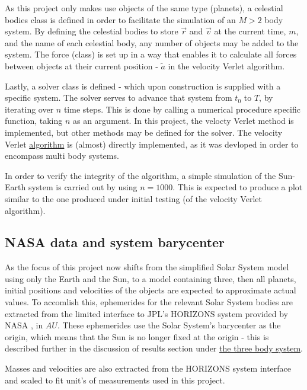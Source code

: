\documentclass[%
oneside,                 %
final,                   %
10pt]{article}
\begin{document}
As this project only makes use objects of the same type (planets), a celestial bodies class is defined in order to facilitate the simulation of an $M>2$ body system. By defining the celestial bodies to store $\vec{r}$ and $\vec{v}$ at the current time, $m$, and the name of each celestial body, any number of objects may be added to the system. The force (class) is set up in a way that enables it to calculate all forces between objects at their current position - $\tilde{a}$ in the velocity Verlet algorithm. \newline

Lastly, a solver class is defined - which upon construction is supplied with a specific system. The solver serves to advance that system from $t_{0}$ to $T$, by iterating over $n$ time steps. This is done by calling a numerical procedure specific function, taking $n$ as an argument. In this project, the velocty Verlet method is implemented, but other methods may be defined for the solver. The velocity Verlet \hyperref[subsec:algos]{algorithm} is (almost) directly implemented, as it was devloped in order to encompass multi body systems. \newline

In order to verify the integrity of the algorithm, a simple simulation of the Sun-Earth system is carried out by using $n=1000$. This is expected to produce a plot similar to the one produced under initial testing (of the velocity Verlet algorithm).


\subsection{NASA data and system barycenter}
As the focus of this project now shifts from the simplified Solar System model using only the Earth and the Sun, to a model containing three, then all planets, initial positions and velocities of the objects are expected to approximate actual values. To accomlish this, ephemerides for the relevant Solar System bodies are extracted from the limited interface to JPL's HORIZONS system provided by NASA \cite{nasadata}, in $AU$. These ephemerides use the Solar System's barycenter as the origin, which means that the Sun is no longer fixed at the origin - this is described further in the discussion of results section under  \hyperref[subsec:Discofres:3B]{the three body system}.  \newline

Masses and velocities are also extracted from the HORIZONS system interface and scaled to fit unit's of measurements used in this project.
\end{document}
